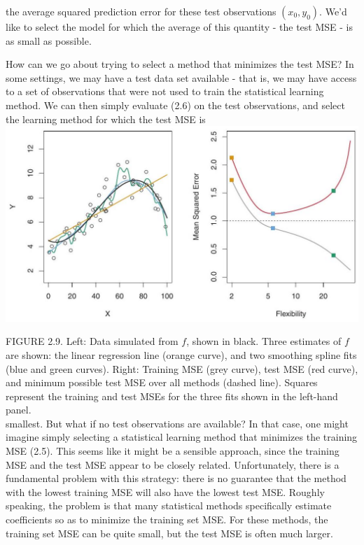 \documentclass[10pt]{article}
\begin{document}
the average squared prediction error for these test observations $\left(x_{0}, y_{0}\right)$. We'd like to select the model for which the average of this quantity - the test MSE - is as small as possible.

How can we go about trying to select a method that minimizes the test MSE? In some settings, we may have a test data set available - that is, we may have access to a set of observations that were not used to train the statistical learning method. We can then simply evaluate (2.6) on the test observations, and select the learning method for which the test MSE is\\
\includegraphics[max width=\textwidth, center]{2025_05_05_efe77898333945044de4g-046}

FIGURE 2.9. Left: Data simulated from $f$, shown in black. Three estimates of $f$ are shown: the linear regression line (orange curve), and two smoothing spline fits (blue and green curves). Right: Training MSE (grey curve), test MSE (red curve), and minimum possible test MSE over all methods (dashed line). Squares represent the training and test MSEs for the three fits shown in the left-hand panel.\\
smallest. But what if no test observations are available? In that case, one might imagine simply selecting a statistical learning method that minimizes the training MSE (2.5). This seems like it might be a sensible approach, since the training MSE and the test MSE appear to be closely related. Unfortunately, there is a fundamental problem with this strategy: there is no guarantee that the method with the lowest training MSE will also have the lowest test MSE. Roughly speaking, the problem is that many statistical methods specifically estimate coefficients so as to minimize the training set MSE. For these methods, the training set MSE can be quite small, but the test MSE is often much larger.
\end{document}
